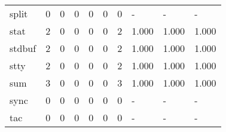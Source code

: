 \begin{longtable}{lp{1.3cm}p{1.3cm}p{1.3cm}p{1.3cm}p{1.3cm}p{1.3cm}p{1.3cm}p{1.3cm}p{1.3cm}}
split     &                      0 &                                  0 &                                 0 &                                0 &                                 0 &                               0 &                                    - &                                      - &                                    - \\
stat      &                      2 &                                  0 &                                 0 &                                0 &                                 0 &                               2 &                                1.000 &                                  1.000 &                                1.000 \\
stdbuf    &                      2 &                                  0 &                                 0 &                                0 &                                 0 &                               2 &                                1.000 &                                  1.000 &                                1.000 \\
stty      &                      2 &                                  0 &                                 0 &                                0 &                                 0 &                               2 &                                1.000 &                                  1.000 &                                1.000 \\
sum       &                      3 &                                  0 &                                 0 &                                0 &                                 0 &                               3 &                                1.000 &                                  1.000 &                                1.000 \\
sync      &                      0 &                                  0 &                                 0 &                                0 &                                 0 &                               0 &                                    - &                                      - &                                    - \\
tac       &                      0 &                                  0 &                                 0 &                                0 &                                 0 &                               0 &                                    - &                                      - &                                    - \\

\end{longtable}
